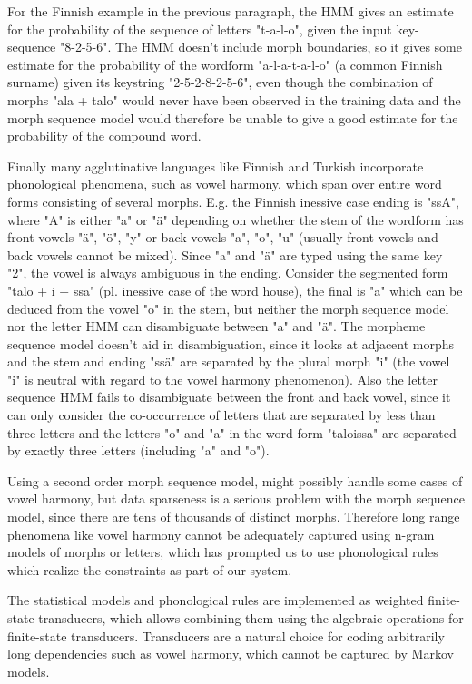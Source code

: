 \documentclass{llncs}
\begin{document}
For the Finnish example in the previous paragraph, the HMM gives an
estimate for the probability of the sequence of letters "t-a-l-o",
given the input key-sequence "8-2-5-6". The HMM doesn't include
morph boundaries, so it gives some estimate for the probability of
the wordform "a-l-a-t-a-l-o" (a common Finnish surname) given its keystring
"2-5-2-8-2-5-6", even though the combination of morphs "ala + talo"
would never have been observed in the training data and the morph
sequence model would therefore be unable to give a good estimate for
the probability of the compound word.

Finally many agglutinative languages like Finnish and Turkish
incorporate phonological phenomena, such as vowel harmony, which span
over entire word forms consisting of several morphs. E.g. the Finnish
inessive case ending is "ssA", where "A" is either "a" or "\"{a}"
depending on whether the stem of the wordform has front vowels "ä",
"ö", "y" or back vowels "a", "o", "u" (usually front vowels and back
vowels cannot be mixed). Since "a" and "\"{a}" are typed using the
same key "2", the vowel is always ambiguous in the ending. Consider
the segmented form "talo + i + ssa" (pl. inessive case of the word
house), the final is "a" which can be deduced from the vowel "o" in
the stem, but neither the morph sequence model nor the letter HMM can
disambiguate between "a" and "ä". The morpheme sequence model doesn't
aid in disambiguation, since it looks at adjacent morphs and the stem
and ending "ss\"{a}" are separated by the plural morph "i" (the vowel
"i" is neutral with regard to the vowel harmony phenomenon). Also the
letter sequence HMM fails to disambiguate between the front and back
vowel, since it can only consider the co-occurrence of letters that
are separated by less than three letters and the letters "o" and "a"
in the word form "taloissa" are separated by exactly three letters
(including "a" and "o").

Using a second order morph sequence model, might possibly handle some
cases of vowel harmony, but data sparseness is a serious problem with
the morph sequence model, since there are tens of thousands of
distinct morphs. Therefore long range phenomena like vowel harmony
cannot be adequately captured using n-gram models of morphs or
letters, which has prompted us to use phonological rules which realize
the constraints as part of our system.

The statistical models and phonological rules are implemented as
weighted finite-state transducers, which allows combining them using
the algebraic operations for finite-state transducers. Transducers are
a natural choice for coding arbitrarily long dependencies such as
vowel harmony, which cannot be captured by Markov models.
\end{document}
